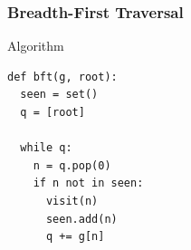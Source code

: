 \documentclass[dvipsnames]{beamer}
\begin{document}
\begin{frame}[fragile=singleslide]
  \frametitle{Breadth-First Traversal}
  \begin{block}{Algorithm}
    \begin{Verbatim}
def bft(g, root):
  seen = set()   
  q = [root]     
                 
  while q:       
    n = q.pop(0) 
    if n not in seen:
      visit(n)   
      seen.add(n)
      q += g[n]    
    \end{Verbatim}
  \end{block}
\end{frame}
\end{document}
